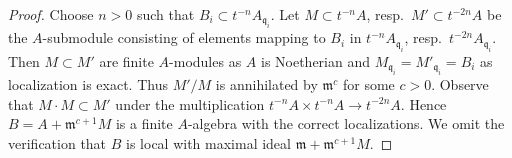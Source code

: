 \documentclass[10pt,a4paper]{amsart}
\theoremstyle{plain}
\theoremstyle{definition}
\theoremstyle{remark}
\numberwithin{equation}{subsection}
\begin{document}
\begin{proof}
Choose $n > 0$ such that $B_i \subset t^{-n}A_{\mathfrak q_i}$.
Let $M \subset t^{-n}A$, resp.\ $M' \subset t^{-2n}A$ be the
$A$-submodule consisting of elements mapping to $B_i$ in
$t^{-n}A_{\mathfrak q_i}$, resp.\ $t^{-2n}A_{\mathfrak q_i}$.
Then $M \subset M'$ are finite $A$-modules as $A$ is Noetherian
and $M_{\mathfrak q_i} = M'_{\mathfrak q_i} = B_i$ as localization
is exact. Thus $M'/M$ is annihilated by $\mathfrak m^c$ for some
$c > 0$. Observe that $M \cdot M \subset M'$ under the multiplication
$t^{-n}A \times t^{-n}A \to t^{-2n}A$. Hence
$B = A + \mathfrak m^{c + 1}M$ is a finite $A$-algebra with the correct
localizations. We omit the verification that $B$ is local with
maximal ideal $\mathfrak m + \mathfrak m^{c + 1}M$.
\end{proof}
\end{document}
